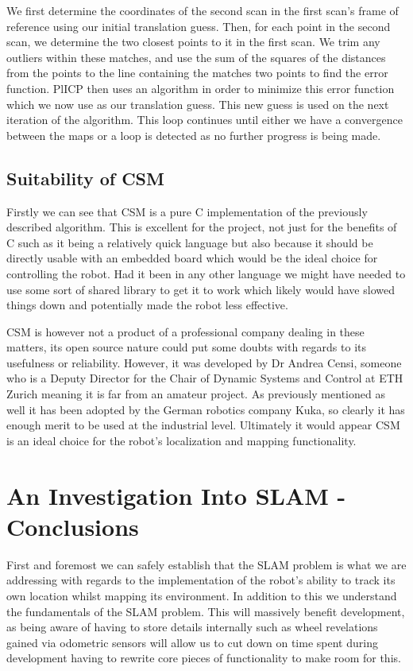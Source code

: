 					We first determine the coordinates of the second scan in the first scan's frame of reference using our initial translation guess. Then, for each point in the second scan, we determine the two closest points to it in the first scan. We trim any outliers within these matches, and use the sum of the squares of the distances from the points to the line containing the matches two points to find the error function. PlICP then uses an algorithm in order to minimize this error function which we now use as our translation guess. This new guess is used on the next iteration of the algorithm. This loop continues until either we have a convergence between the maps or a loop is detected as no further progress is being made.	
					
			\subsection{Suitability of CSM}
			Firstly we can see that CSM is a pure C implementation of the previously described algorithm. This is excellent for the project, not just for the benefits of C such as it being a relatively quick language but also because it should be directly usable with an embedded board which would be the ideal choice for controlling the robot. Had it been in any other language we might have needed to use some sort of shared library to get it to work which likely would have slowed things down and potentially made the robot less effective. 
			
			CSM is however not a product of a professional company dealing in these matters, its open source nature could put some doubts with regards to its usefulness or reliability. However, it was developed by Dr Andrea Censi, someone who is a Deputy Director for the Chair of Dynamic Systems and Control at ETH Zurich meaning it is far from an amateur project. As previously mentioned as well it has been adopted by the German robotics company Kuka, so clearly it has enough merit to be used at the industrial level. Ultimately it would appear CSM is an ideal choice for the robot's localization and mapping functionality.
					
			\section{An Investigation Into SLAM - Conclusions}	
			First and foremost we can safely establish that the SLAM problem is what we are addressing with regards to the implementation of the robot's ability to track its own location whilst mapping its environment. In addition to this we understand the fundamentals of the SLAM problem. This will massively benefit development, as being aware of having to store details internally such as wheel revelations gained via odometric sensors will allow us to cut down on time spent during development having to rewrite core pieces of functionality to make room for this. 

